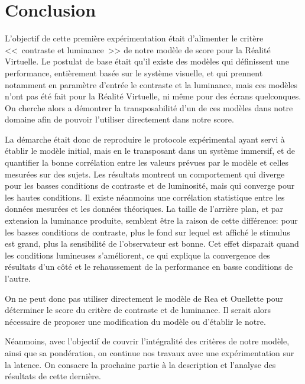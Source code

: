 \chapter*{Conclusion}
\par L'objectif de cette première expérimentation était d'alimenter le critère <<~contraste et luminance~>> de notre modèle de score pour la Réalité Virtuelle. Le postulat de base était qu'il existe des modèles qui définissent une performance, entièrement basée sur le système visuelle, et qui prennent notamment en paramètre d'entrée le contraste et la luminance, mais ces modèles n'ont pas été fait pour la Réalité Virtuelle, ni même pour des écrans quelconques. On cherche alors a démontrer la transposabilité d'un de ces modèles dans notre domaine afin de pouvoir l'utiliser directement dans notre score.

\par La démarche était donc de reproduire le protocole expérimental ayant servi à établir le modèle initial, mais en le transposant  dans un système immersif, et de quantifier la bonne corrélation entre les valeurs prévues par le modèle et celles mesurées sur des sujets. Les résultats montrent un comportement qui diverge pour les basses conditions de contraste et de luminosité, mais qui converge pour les hautes conditions. Il existe néanmoins une corrélation statistique entre les données mesurées et les données théoriques. La taille de l'arrière plan, et par extension la luminance produite, semblent être la raison de cette différence: pour les basses conditions de contraste, plus le fond sur lequel est affiché le stimulus est grand, plus la sensibilité de l'observateur est bonne. Cet effet disparait quand les conditions lumineuses s'améliorent, ce qui explique la convergence des résultats d'un côté et le rehaussement de la performance en basse conditions de l'autre.

\par On ne peut donc pas utiliser directement le modèle de Rea et Ouellette pour déterminer le score du critère de contraste et de luminance. Il serait alors nécessaire de proposer une modification du modèle ou d'établir le notre.

\par Néanmoins, avec l'objectif de couvrir l'intégralité des critères de notre modèle, ainsi que sa pondération, on continue nos travaux avec une expérimentation sur la latence. On consacre la prochaine partie à la description et l'analyse des résultats de cette dernière.